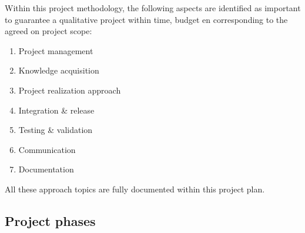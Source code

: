 Within this project methodology, the following aspects are identified as important to guarantee a qualitative project within time, budget en corresponding to the agreed on project scope: 
\begin{enumerate}
	\item Project management
	\item Knowledge acquisition 
	\item Project realization approach
	\item Integration \& release
	\item Testing \& validation
	\item Communication
	\item Documentation
\end {enumerate}

All these approach topics are fully documented within this project plan.


\subsection{Project phases}

